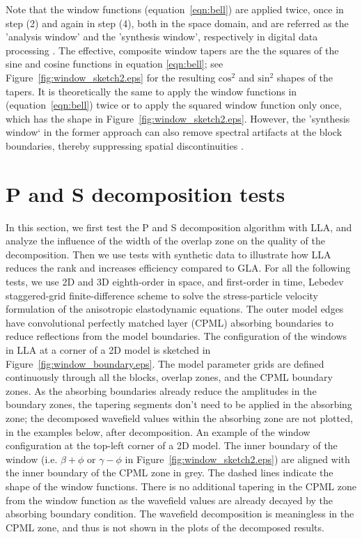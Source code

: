 \documentclass[manuscript,ulem,graphix,revised]{geophysics}
\begin{document}
Note that the window functions (equation~\ref{eqn:bell}) are applied twice, once in step (2) and again in step (4), both in the space domain, and are referred as the 'analysis window' and the 'synthesis window', respectively in digital data processing \mbox{\citep{julius11}}. The effective, composite window tapers are the the squares of the sine and cosine functions in equation \ref{eqn:bell}; see Figure~\ref{fig:window_sketch2.eps} for the resulting $\mathrm{cos^2}$ and $\mathrm{sin^2}$ shapes of the tapers. It is theoretically the same to apply the window functions in (equation~\ref{eqn:bell}) twice or to apply the squared window function only once, which has the shape in Figure~\ref{fig:window_sketch2.eps}. However, the 'synthesis window` in the former approach can also remove spectral artifacts at the block boundaries, thereby suppressing spatial discontinuities \mbox{\citep{julius11}}. 

\section{P and S decomposition tests}
\indent\indent
In this section, we first test the P and S decomposition algorithm with LLA, and analyze the influence of the width of the overlap zone on the quality of the decomposition. Then we use tests with synthetic data to illustrate how LLA reduces the rank and increases efficiency compared to GLA.
For all the following tests, we use 2D and 3D eighth-order in space, and first-order in time, Lebedev staggered-grid finite-difference scheme \citep{vadim10} to solve the stress-particle velocity formulation of the anisotropic elastodynamic equations. The outer model edges have convolutional perfectly matched layer (CPML) absorbing boundaries \citep{komatitsch07} to reduce reflections from the model boundaries. 
The configuration of the windows in LLA at a corner of a 2D model is sketched in Figure~\ref{fig:window_boundary.eps}. The model parameter grids are defined continuously through all the blocks, overlap zones, and the CPML boundary zones. As the absorbing boundaries already reduce the amplitudes in the boundary zones, the tapering segments don't need to be applied in the absorbing zone; the decomposed wavefield values within the absorbing zone are not plotted, in the examples below, after decomposition.
 {
An example of the window configuration at the top-left corner of a 2D model. 
The inner boundary of the window (i.e. $\beta+\phi$ or $\gamma-\phi$ in Figure~\ref{fig:window_sketch2.eps}) are aligned with the inner boundary of the CPML zone in grey.
The dashed lines indicate the shape of the window functions. There is no additional tapering in the CPML zone from the window function as the wavefield values are already decayed by the absorbing boundary condition. The wavefield decomposition is meaningless in the CPML zone, and thus is not shown in the plots of the decomposed results.
}
\end{document}
